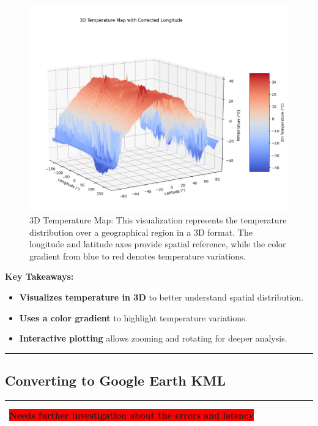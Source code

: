 \documentclass[a4paper,10pt]{article}
\begin{document}
\begin{figure}[H]
    \centering
    \includegraphics[width=0.739 \textwidth]{3d_map.png}
    \caption{3D Temperature Map: This visualization represents the temperature distribution over a geographical region in a 3D format. The longitude and latitude axes provide spatial reference, while the color gradient from blue to red denotes temperature variations.}
    \label{fig:3d_temp_map}
\end{figure}



\textbf{Key Takeaways:}
\begin{itemize}
    \item \textbf{Visualizes temperature in 3D} to better understand spatial distribution.
    \item \textbf{Uses a color gradient} to highlight temperature variations.
    \item \textbf{Interactive plotting} allows zooming and rotating for deeper analysis.
\end{itemize}


\begin{center}  
{\color{red} \rule{\linewidth}{1mm} }
\end{center}  
\subsection{Converting to Google Earth KML}
\begin{center}  
{\color{red} \rule{\linewidth}{.1mm}} \
\textbf{\color{white}\colorbox{red}{Needs further investigation about the errors and latency}}  \
\end{center}
\end{document}
